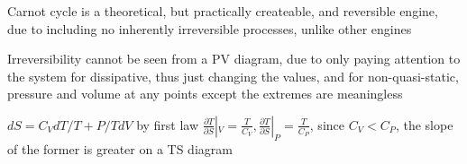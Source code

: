 \documentclass[11 pt, twoside]{article}
\begin{document}
Carnot cycle is a theoretical, but practically createable, and reversible engine, due to including no inherently irreversible processes, unlike other engines

Irreversibility cannot be seen from a PV diagram, due to only paying attention to the system for dissipative, thus just changing the values, and for non-quasi-static, pressure and volume at any points except the extremes are meaningless

$dS = C_V dT/T + P/T dV$ by first law
$\frac{\partial T}{\partial S}|_V = \frac{T}{C_V}, \frac{\partial T}{\partial S}|_P = \frac{T}{C_P}$, since $C_V < C_P$, the slope of the former is greater on a TS diagram 
\end{document}
